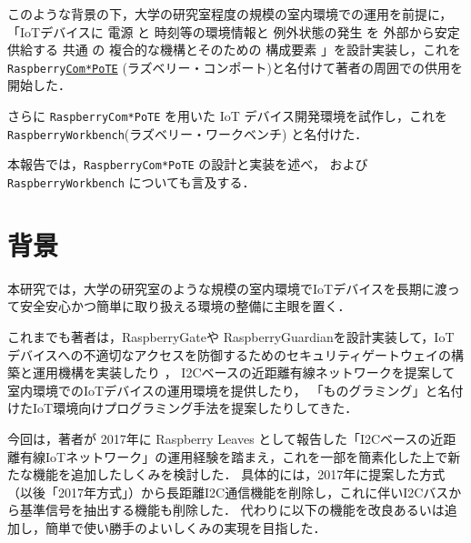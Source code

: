 このような背景の下，大学の研究室程度の規模の室内環境での運用を前提に，
「IoTデバイスに
電源 と
時刻等の環境情報と
例外状態の発生 を
外部から安定供給する
共通 の
複合的な機構とそのための
構成要素
」を設計実装し，これを
{\tt Raspberry\underline{Com*PoTE}}
(ラズベリー・コンポート)と名付けて著者の周囲での供用を開始した．

さらに {\tt Raspberry\-Com*PoTE} を用いた IoT デバイス開発環境を試作し，これを
{\tt Raspberry\-Workbench}(ラズベリー・ワークベンチ)
と名付けた．

本報告では，{\tt Raspberry\-Com*PoTE} の設計と実装を述べ，
および {\tt Raspberry\-Workbench} についても言及する．


\section{背景}
\label{sec:02background}

本研究では，大学の研究室のような規模の室内環境でIoTデバイスを長期に渡って安全安心かつ簡単に取り扱える環境の整備に主眼を置く．

これまでも著者は，RaspberryGateや RaspberryGuardianを設計実装して，IoTデバイスへの不適切なアクセスを防御するためのセキュリティゲートウェイの構築と運用機構を実装したり\cite{hohno:RaspberryGate}\cite{hohno:RaspberryGuardian} ，
I2Cベースの近距離有線ネットワークを提案して室内環境でのIoTデバイスの運用環境を提供したり\cite{hohno:I2CwiredLAN-2017}，
「ものグラミング」と名付けたIoT環境向けプログラミング手法を提案したりしてきた\cite{hohno:monogramming2}．

今回は，著者が 2017年に Raspberry Leaves として報告した「I2Cベースの近距離有線IoTネットワーク」の運用経験を踏まえ，これを一部を簡素化した上で新たな機能を追加したしくみを検討した．
具体的には，2017年に提案した方式（以後「2017年方式」）から長距離I2C通信機能を削除し，これに伴いI2Cバスから基準信号を抽出する機能も削除した．
代わりに以下の機能を改良あるいは追加し，簡単で使い勝手のよいしくみの実現を目指した．

